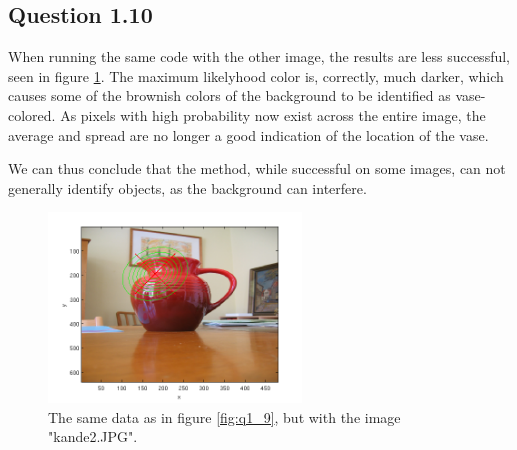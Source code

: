 \documentclass[a4paper, 10pt, final]{article}
\begin{document}
\subsection*{Question 1.10}

When running the same code with the other image, the results are less successful, seen in figure \ref{fig:q1_10}.
The maximum likelyhood color is, correctly, much darker, which causes some of the brownish colors of the background to be identified as vase-colored.
As pixels with high probability now exist across the entire image, the average and spread are no longer a good indication of the location of the vase.

We can thus conclude that the method, while successful on some images, can not generally identify objects, as the background can interfere.

\begin{figure}[!htpb]
  \centering
  \includegraphics[width=0.6\textwidth]{images/kande2.png}
  \caption{The same data as in figure \ref{fig:q1_9}, but with the image "kande2.JPG".}
  \label{fig:q1_10}
\end{figure}


\newpage
\subsection*{\label{text:Code}}




%
%
\end{document}
